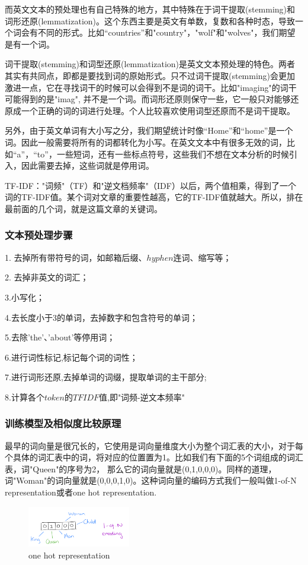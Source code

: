 \documentclass[UTF8,a4paper,10pt, twocolumn]{ctexart}
\begin{document}
而英文文本的预处理也有自己特殊的地方，其中特殊在于词干提取(stemming)和词形还原(lemmatization)。这个东西主要是英文有单数，复数和各种时态，导致一个词会有不同的形式。比如“countries”和"country"，"wolf"和"wolves"，我们期望是有一个词。

词干提取(stemming)和词型还原(lemmatization)是英文文本预处理的特色。两者其实有共同点，即都是要找到词的原始形式。只不过词干提取(stemming)会更加激进一点，它在寻找词干的时候可以会得到不是词的词干。比如"imaging"的词干可能得到的是"imag", 并不是一个词。而词形还原则保守一些，它一般只对能够还原成一个正确的词的词进行处理。个人比较喜欢使用词型还原而不是词干提取。

另外，由于英文单词有大小写之分，我们期望统计时像“Home”和“home”是一个词。因此一般需要将所有的词都转化为小写。在英文文本中有很多无效的词，比如“a”，“to”，一些短词，还有一些标点符号，这些我们不想在文本分析的时候引入，因此需要去掉，这些词就是停用词。

TF-IDF："词频"（TF）和"逆文档频率"（IDF）以后，两个值相乘，得到了一个词的TF-IDF值。某个词对文章的重要性越高，它的TF-IDF值就越大。所以，排在最前面的几个词，就是这篇文章的关键词。

\subsubsection{文本预处理步骤}
1. 去掉所有带符号的词，如邮箱后缀、$hyphen$连词、缩写等；

2. 去掉非英文的词汇；

3.小写化；

4.去长度小于3的单词，去掉数字和包含符号的单词；

5.去除'the'、'about'等停用词；

6.进行词性标记,标记每个词的词性；

7.进行词形还原,去掉单词的词缀，提取单词的主干部分;

8.计算各个$token$的$TFIDF$值,即"词频-逆文本频率"

\subsubsection{训练模型及相似度比较原理}
最早的词向量是很冗长的，它使用是词向量维度大小为整个词汇表的大小，对于每个具体的词汇表中的词，将对应的位置置为1。比如我们有下面的5个词组成的词汇表，词"Queen"的序号为2， 那么它的词向量就是(0,1,0,0,0)。同样的道理，词"Woman"的词向量就是(0,0,0,1,0)。这种词向量的编码方式我们一般叫做1-of-N representation或者one hot representation.

\begin{figure}[htbp]
  \centering
  \includegraphics[width=0.4\textwidth]{img/fig8.png}
  \caption{one hot representation}
  \label{figure:zju6}
  \end{figure}
\end{document}
